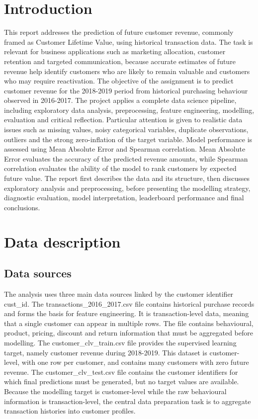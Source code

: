 \section{Introduction}
This report addresses the prediction of future customer revenue, commonly framed as Customer Lifetime Value, using historical transaction data. The task is relevant for business applications such as marketing allocation, customer retention and targeted communication, because accurate estimates of future revenue help identify customers who are likely to remain valuable and customers who may require reactivation.
The objective of the assignment is to predict customer revenue for the 2018-2019 period from historical purchasing behaviour observed in 2016-2017. The project applies a complete data science pipeline, including exploratory data analysis, preprocessing, feature engineering, modelling, evaluation and critical reflection. Particular attention is given to realistic data issues such as missing values, noisy categorical variables, duplicate observations, outliers and the strong zero-inflation of the target variable.
Model performance is assessed using Mean Absolute Error and Spearman correlation. Mean Absolute Error evaluates the accuracy of the predicted revenue amounts, while Spearman correlation evaluates the ability of the model to rank customers by expected future value. The report first describes the data and its structure, then discusses exploratory analysis and preprocessing, before presenting the modelling strategy, diagnostic evaluation, model interpretation, leaderboard performance and final conclusions.
\section{Data description}
\subsection{Data sources}
The analysis uses three main data sources linked by the customer identifier cust\_id. The transactions\_2016\_2017.csv file contains historical purchase records and forms the basis for feature engineering. It is transaction-level data, meaning that a single customer can appear in multiple rows. The file contains behavioural, product, pricing, discount and return information that must be aggregated before modelling.
The customer\_clv\_train.csv file provides the supervised learning target, namely customer revenue during 2018-2019. This dataset is customer-level, with one row per customer, and contains many customers with zero future revenue. The customer\_clv\_test.csv file contains the customer identifiers for which final predictions must be generated, but no target values are available. Because the modelling target is customer-level while the raw behavioural information is transaction-level, the central data preparation task is to aggregate transaction histories into customer profiles.

